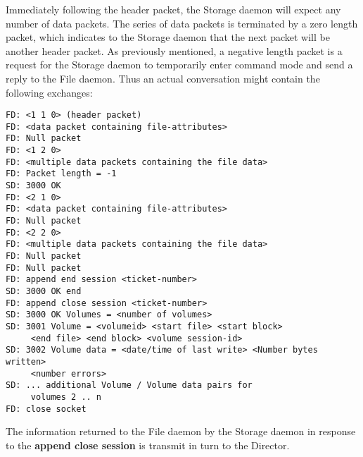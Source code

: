Immediately following the header packet, the Storage daemon will expect any
number of data packets. The series of data packets is terminated by a zero
length packet, which indicates to the Storage daemon that the next packet will
be another header packet. As previously mentioned, a negative length packet is
a request for the Storage daemon to temporarily enter command mode and send a
reply to the File daemon. Thus an actual conversation might contain the
following exchanges:

\footnotesize
\begin{verbatim}
FD: <1 1 0> (header packet)
FD: <data packet containing file-attributes>
FD: Null packet
FD: <1 2 0>
FD: <multiple data packets containing the file data>
FD: Packet length = -1
SD: 3000 OK
FD: <2 1 0>
FD: <data packet containing file-attributes>
FD: Null packet
FD: <2 2 0>
FD: <multiple data packets containing the file data>
FD: Null packet
FD: Null packet
FD: append end session <ticket-number>
SD: 3000 OK end
FD: append close session <ticket-number>
SD: 3000 OK Volumes = <number of volumes>
SD: 3001 Volume = <volumeid> <start file> <start block>
     <end file> <end block> <volume session-id>
SD: 3002 Volume data = <date/time of last write> <Number bytes written>
     <number errors>
SD: ... additional Volume / Volume data pairs for
     volumes 2 .. n
FD: close socket
\end{verbatim}
\normalsize

The information returned to the File daemon by the Storage daemon in response
to the {\bf append close session} is transmit in turn to the Director.
